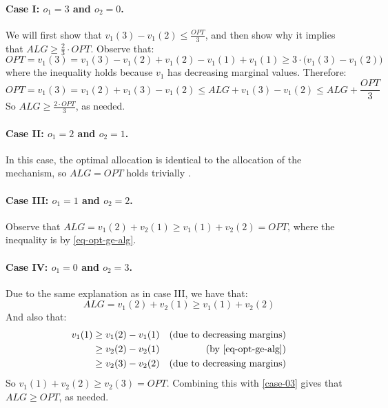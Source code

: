 \paragraph{Case I: $o_1=3$ and $o_2=0$.}
We will first show that $v_1(3)-v_1(2)\le \frac{OPT}{3}$, and then show why it implies that $ALG \ge \frac{2}{3}\cdot OPT$.
Observe that:
\begin{equation*}\label{eq-case-30}
    OPT=v_1(3)=v_1(3)-v_1(2)+v_1(2)-v_1(1)+v_1(1) \ge 3\cdot \big(v_1(3)-v_1(2)\big)
\end{equation*}
where the inequality holds because $v_1$ has decreasing marginal values. 
Therefore:
$$
OPT=v_1(3)=v_1(2)+v_1(3)-v_1(2)\le ALG +v_1(3)-v_1(2)\le ALG + \frac{OPT}{3}
$$
So $ALG \ge \frac{2\cdot OPT}{3}$, as needed. 



\paragraph{Case II: $o_1=2$ and $o_2=1$.} In this case, the optimal allocation is identical to the allocation of the mechanism, so $ALG=OPT$ holds trivially .

\paragraph{Case III: $o_1=1$ and $o_2=2$.} Observe that $ALG=v_1(2)+v_2(1)\ge v_1(1)+v_2(2)=OPT$, where the inequality is by \cref{eq-opt-ge-alg}.


\paragraph{Case IV: $o_1=0$ and $o_2=3$.} Due to the same explanation as in case III, we have that: 
\begin{equation}\label{case-03}
    ALG=v_1(2)+v_2(1)\ge v_1(1)+v_2(2)
\end{equation}
And also that:
\begin{align*}
v_1(1) &\ge v_1(2)-v_1(1) &\text{(due to decreasing margins)} \\
&\ge v_2(2)-v_2(1) &\text{(by \cref{eq-opt-ge-alg})} \\
&\ge v_2(3)-v_2(2) &\text{(due to decreasing margins)} \\ 
\end{align*}
So $v_1(1)+v_2(2)\ge v_2(3)=OPT$. Combining this with \cref{case-03} gives that $ALG \ge OPT$, as needed.  
